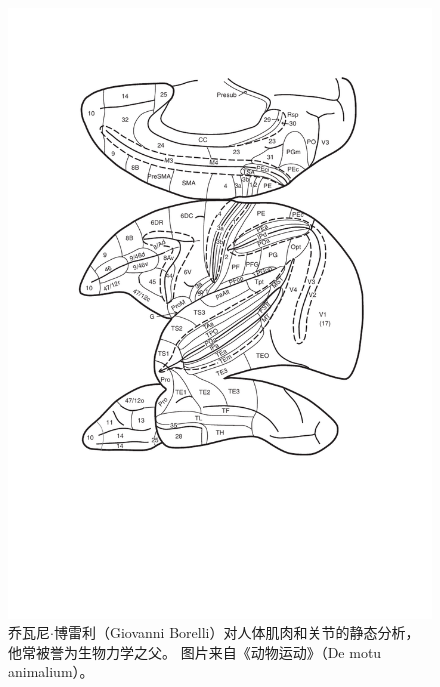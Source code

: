 \begin{figure}[!htb]
	\centering
	\includegraphics[width=0.75\linewidth]{chap1/1_2}
	\caption{乔瓦尼$\cdot$博雷利（Giovanni Borelli）对人体肌肉和关节的静态分析，他常被誉为生物力学之父。
		图片来自《动物运动》（De motu animalium）。 \label{fig:1_2}}
\end{figure}


